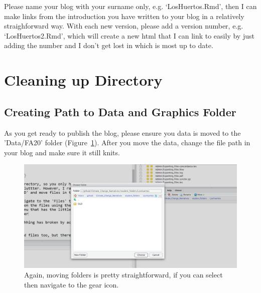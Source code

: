 \documentclass{article}\usepackage[]{graphicx}\usepackage[]{color}
\begin{document}
Please name your blog with your surname only, e.g. `LosHuertos.Rmd', then I can make links from the introduction you have written to your blog in a relatively straighforward way. With each new version, please add a version number, e.g. `LosHuertos2.Rmd', which will create a new html that I can link to easily by just adding the number and I don't get lost in which is most up to date. 




\section{Cleaning up Directory}

\subsection{Creating Path to Data and Graphics Folder}

As you get ready to publish the blog, please ensure you data is moved to the 'Data/FA20' folder (Figure~\ref{fig:move}). After you move the data, change the file path in your blog and make sure it still knits. 

\begin{figure}
\includegraphics[width=\textwidth]{MoveFiles}
\caption{Again, moving folders is pretty straightforward, if you can select then navigate to the gear icon.}
\label{fig:move}
\end{figure}
\end{document}
